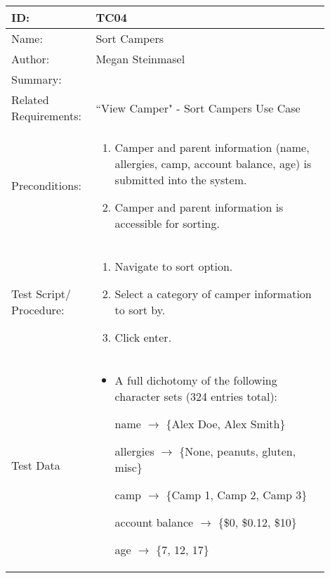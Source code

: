 \documentclass[11pt]{article}
\begin{document}
\begin{table}[H]
\begin{center}
\begin{tabular}{p{0.20\linewidth}p{0.70\linewidth}}
	ID: & TC04\\\hline
	Name: & Sort Campers \\\hline
	Author: & Megan Steinmasel\\\hline
	Summary: &  \\\hline
	Related \hspace{5em} Requirements:& ``View Camper" - Sort Campers Use Case\\\hline
	Preconditions:& \begin{enumerate}
		\item Camper and parent information (name, allergies, camp, account balance, age) is submitted into the system.
		\item Camper and parent information is accessible for sorting.
	\end{enumerate}\\\hline
	Test Script/ Procedure: & \begin{enumerate}
	\item Navigate to sort option.
	\item Select a category of camper information to sort by.
	\item Click enter.
	\end{enumerate}\\\hline
	Test Data & \begin{itemize}
	\item A full dichotomy of the following character sets (324 entries total):
	
	name $\rightarrow$ $\{$Alex Doe, Alex Smith$\}$	
	
	allergies $\rightarrow$ $\{$None, peanuts, gluten, misc$\}$	
	
	camp $\rightarrow$ $\{$Camp 1, Camp 2, Camp 3$\}$
	
	account balance $\rightarrow$ $\{$\$0, \$0.12, \$10$\}$
	
	age $\rightarrow$ $\{$7, 12, 17$\}$
	\end{itemize}
\end{tabular}
\label{des:}	
\end{center}
\end{table}
\end{document}
